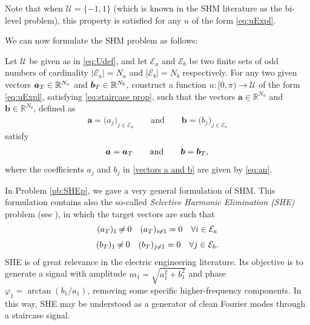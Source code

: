 \documentclass[twocolumn]{autart}    %
\begin{document}
Note that when $\mathcal{U} = \{-1,1\}$ (which is known in the SHM literature as the bi-level problem), this property is satisfied for any $u$ of the form \eqref{eq:uExpl}.

We can now formulate the SHM problem as follows:

\bigskip

\begin{problem}[SHM]\label{pb:SHEp}
Let $\mathcal{U}$ be given as in \eqref{eq:Udef}, and let $\mathcal{E} _a $ and $\mathcal{E} _b $ be two finite sets of odd numbers of cardinality $|\mathcal{E}_a| = N_a $ and $ |\mathcal{E} _b| = N_b$ respectively. For any two given vectors $\aT \in \mathbb{R}^{N_a}$ and $\bT \in \mathbb{R}^{N_b} $, construct a function $u: [0,\pi)\to\mathcal{U}$ of the form \eqref{eq:uExpl}, satisfying \eqref{eq:staircase prop}, such that the vectors $\bm{a} \in \mathbb{R}^{N_a}$ and $\bm{b} \in \mathbb{R}^{N_b}$, defined as
\begin{align}\label{vectors a and b}
	\bm{a} = \big( a_j \big)_{j\in \mathcal{E}_a} \qquad \text{and} \qquad
	\bm{b} = \big( b_j \big)_{j\in \mathcal{E}_b}
\end{align}
satisfy
\begin{align*} 
	\bm{a} = \aT \qquad \text{and} \qquad \bm{b} = \bT,
\end{align*}
where the coefficients $a_j$ and $b_j$ in \eqref{vectors a and b} are given by \eqref{eq:an}.
\end{problem}  
\vspace{1em}

\begin{remark}[SHE]\label{remark:SHE}
In Problem \ref{pb:SHEp}, we gave a very general formulation of SHM. This formulation contains also the so-called \emph{Selective Harmonic Elimination (SHE)} problem (see \cite{Sun1996}), in which the target vectors are such that 
\begin{gather}
	\notag (a_T)_1 \neq 0  \hspace{1em} (a_T)_{i\neq1} = 0 \hspace{1em} \forall i \in \mathcal{E}_a 
	\\[3pt]
	\notag (b_T)_1 \neq 0  \hspace{1em} (b_T)_{j\neq1} = 0 \hspace{1em} \forall j \in \mathcal{E}_b. 
\end{gather}
SHE is of great relevance in the electric engineering literature. Its objective is to generate a signal with amplitude $m_1 = \sqrt{a_1^2+b_1^2}$ and phase $\varphi_1=\arctan(b_1/a_1)$, {\color{red}removing some specific higher-frequency components}. In this way, SHE may be understood as a generator of clean Fourier modes through a staircase signal.
\end{remark}
\end{document}
